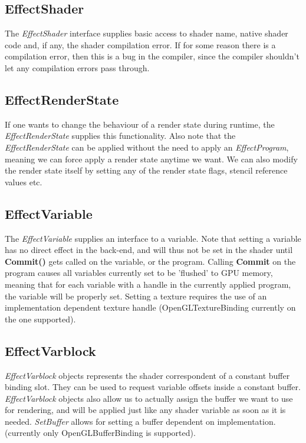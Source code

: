 \documentclass{article}
\begin{document}
\subsection{EffectShader}
The \textit{EffectShader} interface supplies basic access to shader name, native shader code and, if any, the shader compilation error. If for some reason there is a compilation error, then this is a bug in the compiler, since the compiler shouldn't let any compilation errors pass through. 

\subsection{EffectRenderState}
If one wants to change the behaviour of a render state during runtime, the \textit{EffectRenderState} supplies this functionality. Also note that the \textit{EffectRenderState} can be applied without the need to apply an \textit{EffectProgram}, meaning we can force apply a render state anytime we want. We can also modify the render state itself by setting any of the render state flags, stencil reference values etc.

\subsection{EffectVariable}
The \textit{EffectVariable} supplies an interface to a variable. Note that setting a variable has no direct effect in the back-end, and will thus not be set in the shader until \textbf{Commit()} gets called on the variable, or the program. Calling \textbf{Commit} on the program causes all variables currently set to be 'flushed' to GPU memory, meaning that for each variable with a handle in the currently applied program, the variable will be properly set. Setting a texture requires the use of an implementation dependent texture handle (OpenGLTextureBinding currently on the one supported). 

\subsection{EffectVarblock}
\textit{EffectVarblock} objects represents the shader correspondent of a constant buffer binding slot. They can be used to request variable offsets inside a constant buffer. \textit{EffectVarblock} objects also allow us to actually assign the buffer we want to use for rendering, and will be applied just like any shader variable as soon as it is needed. \textit{SetBuffer} allows for setting a buffer dependent on implementation. (currently only OpenGLBufferBinding is supported). 
\end{document}
